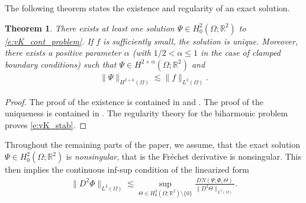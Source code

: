 \documentclass[a4paper]{amsart}
\newtheorem{theorem}{Theorem}
\theoremstyle{definition}
\numberwithin{equation}{section}
\numberwithin{theorem}{section}
\newcommand{\R}{\mathbb{R}}
\begin{document}
The following theorem states the existence and regularity 
of an exact solution.

\begin{theorem}
    There exists at least one solution $\Psi\in H^2_0(\Omega;\R^2)$ 
    to \eqref{e:vK_cont_problem}.
    If $f$ is sufficiently small, the solution is unique.
    Moreover, there exists 
    a positive parameter $\alpha$
    (with $1/2<\alpha\leq 1$ in the case of clamped boundary conditions)
    such that $\Psi\in H^{2+\alpha}(\Omega;\R^2)$ and 
    \begin{align}\label{e:vK_stab}
        \lVert \Psi\rVert_{H^{2+\alpha}(\Omega)} 
        \lesssim \lVert f\rVert_{L^2(\Omega)}.
    \end{align}
\end{theorem}

\begin{proof}
    The proof of the existence is contained in 
    \cite[Theorem~5.8-3, pp.~416]{Ciarlet_bookII_2022} 
    and \cite[Theorem~4, pp.~238]{Knightly1967}.
    The proof of the uniqueness is contained in 
    \cite[Theorem~5]{Knightly1967}.
    The regularity theory for the biharmonic problem 
    \cite{BlumRannacher1980,Grisvard1992} proves 
    \eqref{e:vK_stab}.
\end{proof}



Throughout the remaining parts of the paper, we assume, 
that the exact solution $\Psi\in H^2_0(\Omega;\R^2)$ is 
\emph{nonsingular}, that is \cite[Def.~2.4, pp.466]{Keller1975}
the Fr\'echet derivative is nonsingular. This then implies
the continuous inf-sup condition of the linearized form 
\begin{align}\label{e:vK_inf-sup}
    \lVert D^2\Phi\rVert_{L^2(\Omega)}
    \lesssim \sup_{\Theta\in H^2_0(\Omega;\R^2)\setminus\{0\}} 
         \frac{DN(\Psi;\Phi,\Theta)}{\lVert D^2\Theta\rVert_{L^2(\Omega)}}.
\end{align}
\end{document}
